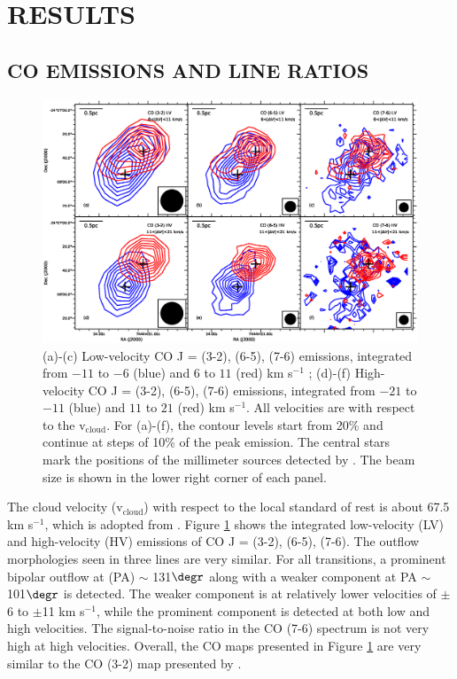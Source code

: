 \section{RESULTS}
\subsection{CO EMISSIONS AND LINE RATIOS}

\begin{figure}[htbp]
\includegraphics[scale=.60]{./fig/ori_contour.eps}
\caption{(a)-(c) Low-velocity CO J = (3-2), (6-5), (7-6) emissions, integrated from $-11$ to $-6$ (blue) and $6$ to $11$ (red) km s$^{-1}$ ; (d)-(f) High-velocity CO J = (3-2), (6-5), (7-6) emissions,  integrated from $-21$ to $-11$ (blue) and $11$ to $21$ (red) km s$^{-1}$. All velocities are with respect to the v$_{\mathrm{cloud}}$. For (a)-(f), the contour levels start from 20\% and continue at steps of 10\% of the peak emission. The central stars mark the positions of the millimeter sources detected by \citet{2009ApJ...696...66Q}. The beam size is shown in the lower right corner of each panel.  \label{fig1}}
\end{figure}

The cloud velocity (v$_{\mathrm{cloud}}$) with respect to the local standard of rest is about 67.5 km s$^{-1}$, which is adopted from \citet{2003A&A...412..175K}. Figure \ref{fig1} shows the integrated low-velocity (LV) and high-velocity (HV) emissions of CO J = (3-2), (6-5), (7-6). The outflow morphologies seen in three lines are very similar. For all transitions, a prominent bipolar outflow at (PA) $\sim$ 131${\degr}$ along with a weaker component at PA $\sim$ 101${\degr}$ is detected. The weaker component is at relatively lower velocities of $\pm$6 to $\pm$11 km s$^{-1}$, while the prominent component is detected at both low and high velocities. The signal-to-noise ratio in the CO (7-6) spectrum is not very high at high velocities. Overall, the CO maps presented in Figure \ref{fig1} are very similar to the CO (3-2) map presented by \citet{2003A&A...412..175K}. 

